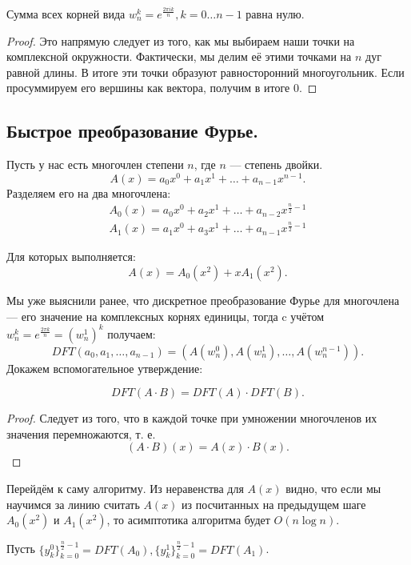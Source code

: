 \begin{remark}
  Сумма всех корней вида $w_{n}^{k} = e^{\frac{2\pi i k}{n}}, k = 0\ldots n - 1$ равна нулю.
\end{remark}
\begin{proof}
  Это напрямую следует из того, как мы выбираем наши точки на комплексной окружности. Фактически, мы
  делим её этими точками на $n$ дуг равной длины. В итоге эти точки образуют равносторонний многоугольник.
  Если просуммируем его вершины как вектора, получим в итоге $0$.
\end{proof}

\subsection{Быстрое преобразование Фурье.}
Пусть у нас есть многочлен степени $n$, где $n$ --- степень двойки.
\[
  A(x) = a_0 x^{0} + a_1 x^{1} + \ldots + a_{n-1} x^{n-1}
.\] 
Разделяем его на два многочлена:
\begin{gather*}
  A_0(x) = a_0 x^{0} + a_2 x^{1} + \ldots + a_{n-2} x^{\frac{n}{2} - 1} \\
  A_1(x) = a_1 x^{0} + a_3 x^{1} + \ldots + a_{n-1} x^{\frac{n}{2} - 1}
\end{gather*}

Для которых выполняется:
\[
  A(x) = A_0(x^2) + x A_1(x^2)
.\] 

Мы уже выяснили ранее, что дискретное преобразование Фурье для многочлена --- его значение на 
комплексных корнях единицы, тогда c учётом $w_{n}^{k} = e^{\frac{2\pi k}{n}} = (w_{n}^{1})^{k}$ получаем:
\[
  DFT(a_0, a_1, \ldots, a_{n-1}) = (A(w_{n}^{0}), A(w_{n}^{1}), \ldots, A(w_{n}^{n-1})) 
.\] 
Докажем вспомогательное утверждение:
\begin{remark}
 \[
  DFT(A \cdot B) = DFT(A) \cdot DFT(B)
 .\]   
\end{remark}
\begin{proof}
  Следует из того, что в каждой точке при умножении многочленов их значения перемножаются, т. е.
  \[
    (A \cdot B)(x) = A(x) \cdot B(x)
  .\] 
\end{proof}

Перейдём к саму алгоритму. Из неравенства для $A(x)$ видно, что если мы научимся за линию считать 
$A(x)$ из посчитанных на предыдущем шаге  $A_0(x^2)$ и $A_1(x^2)$, то асимптотика алгоритма будет
$O(n \log n)$.

Пусть $\{ y_{k}^{0}\}_{k = 0}^{\frac{n}{2} - 1} = DFT(A_0), \{ y_{k}^{1}\}_{k = 0}^{\frac{n}{2} - 1} = DFT(A_1)$.

